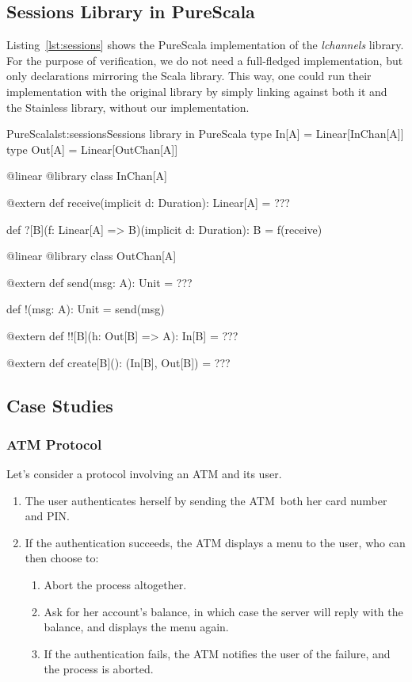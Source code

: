 \documentclass[a4paper,twoside]{article}
\newcommand{\RefCode}[1]{Listing~\ref{#1}}
\begin{document}
\subsection{Sessions Library in PureScala}
\label{sessions_lib}

\RefCode{lst:sessions} shows the PureScala implementation of the \textit{lchannels} library. For the purpose of verification, we do not need a full-fledged implementation, but only declarations mirroring the Scala library. This way, one could run their implementation with the original library by simply linking against both it and the Stainless library, without our implementation.

\begin{Code}{PureScala}{lst:sessions}{Sessions library in PureScala}
type In[A]  = Linear[InChan[A]]
type Out[A] = Linear[OutChan[A]]

@linear @library
class InChan[A] {

  @extern
  def receive(implicit d: Duration): Linear[A] = {
    ???
  }

  def ?[B](f: Linear[A] => B)(implicit d: Duration): B = {
    f(receive)
  }
}

@linear @library
class OutChan[A] {

  @extern
  def send(msg: A): Unit = {
    ???
  }

  def !(msg: A): Unit = {
    send(msg)
  }

  @extern
  def !![B](h: Out[B] => A): In[B] = {
    ???
  }

  @extern
  def create[B](): (In[B], Out[B]) = {
    ???
  }
}
\end{Code}

\subsection{Case Studies}

\subsubsection{ATM Protocol}

Let's consider a protocol involving an ATM and its user.

\begin{enumerate}
\item The user authenticates herself by sending the ATM both her card number and PIN.
\item If the authentication succeeds, the ATM displays a menu to the user, who can then choose to:
\begin{enumerate}
\item Abort the process altogether.
\item Ask for her account's balance, in which case the server will reply with the balance, and displays the menu again.
\item If the authentication fails, the ATM notifies the user of the failure, and the process is aborted.
\end{enumerate}
\end{enumerate}
\end{document}
